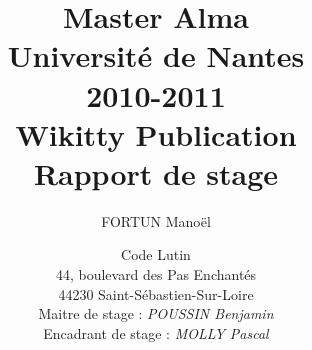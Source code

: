 \documentclass[12pt,a4paper,utf8x]{article}
\title
{
	\normalsize{Master Alma\\
	Université de Nantes\\
	2010-2011}\\
	\vspace{15mm}
	\Huge{Wikitty Publication}\\
	\normalsize{Rapport de stage}
}
\author{FORTUN Manoël\\
	\vspace{45mm}
}
\date{	
	\normalsize{Code Lutin\\
	44, boulevard des Pas Enchantés\\
	44230 Saint-Sébastien-Sur-Loire\\
	\vspace{5mm}	
	Maitre de stage : \emph{POUSSIN Benjamin} \\
	Encadrant de stage : \emph{MOLLY Pascal}
	}
}
\begin{document}
\maketitle
\clearpage
\newpage
\null
\newpage


\clearpage

\clearpage

\clearpage

\tableofcontents


\clearpage

\clearpage

\clearpage

\clearpage

\clearpage

\clearpage

\clearpage

\clearpage

\clearpage

\clearpage

\end{document}

